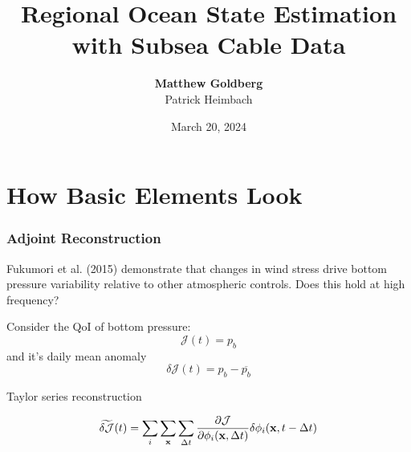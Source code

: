 \documentclass[10pt, aspectratio=169]{oden_beamer}
\begin{document}

\title{Regional Ocean State Estimation with Subsea Cable Data}
\author{\textbf{Matthew Goldberg}\\
        Patrick Heimbach
}
\date{
    \centering
    March 20, 2024
}

\begin{frame} %
\titlepage
\end{frame}

\section{How Basic Elements Look} %

\begin{frame} %
\frametitle{Adjoint Reconstruction}

Fukumori et al. (2015) demonstrate that changes in wind stress drive bottom pressure variability relative to other atmospheric controls. Does this hold at high frequency?

\vspace{.5cm}

Consider the QoI of bottom pressure:
\begin{equation*}
    \mathcal{J}(t)=p_b
\end{equation*}
and it's daily mean anomaly 
\begin{equation*}
    \delta\mathcal{J}(t)=p_b - \overline{p_b}
\end{equation*}

Taylor series reconstruction 

\begin{equation*}
    \widetilde{\delta\mathcal{J}}(t)=\sum_i\sum_{\bf x}\sum_{\Delta t}\frac{\partial \mathcal{J}}{\partial\phi_i({\bf x}, \Delta t)}\delta\phi_i({\bf x},t-\Delta t)
\end{equation*}
\end{frame}
\end{document}
